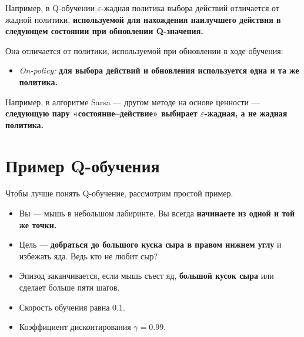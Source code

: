 \documentclass[11pt,a4paper]{article}
\begin{document}
Например, в Q-обучении \(\varepsilon\)-жадная политика выбора действий отличается от жадной политики, \textbf{используемой для нахождения наилучшего действия в следующем состоянии при обновлении Q-значения.}


Она отличается от политики, используемой при обновлении в ходе обучения:


\begin{itemize}
\tightlist
\item
  \emph{On-policy:} \textbf{для выбора действий и обновления используется одна и та же политика.}
\end{itemize}

Например, в алгоритме Sarsa --- другом методе на основе ценности --- \textbf{следующую пару «состояние--действие» выбирает \(\varepsilon\)-жадная, а не жадная политика.}



\section{Пример Q-обучения}\label{a-q-learning-example}

Чтобы лучше понять Q-обучение, рассмотрим простой пример.


\begin{itemize}
\tightlist
\item
  Вы --- мышь в небольшом лабиринте. Вы всегда \textbf{начинаете из одной и той же точки.}
\item
  Цель --- \textbf{добраться до большого куска сыра в правом нижнем углу} и избежать яда. Ведь кто не любит сыр?
\item
  Эпизод заканчивается, если мышь съест яд, \textbf{большой кусок сыра} или сделает больше пяти шагов.
\item
  Скорость обучения равна 0.1.
\item
  Коэффициент дисконтирования \(\gamma=0.99\).
\end{itemize}
\end{document}
